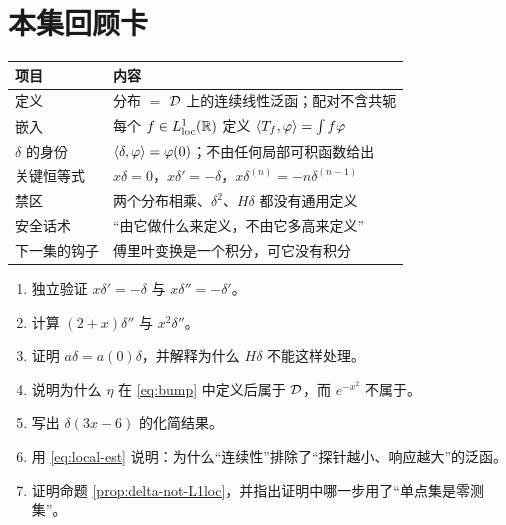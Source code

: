 \section{本集回顾卡}

\begin{center}
\small
\renewcommand{\arraystretch}{1.4}
\begin{tabularx}{\textwidth}{@{}L{3.4cm}Y@{}}
\toprule
项目 & 内容 \\
\midrule
定义 & 分布 $=$ $\mathcal{D}$ 上的连续线性泛函；配对不含共轭 \\
嵌入 & 每个 $f\in L^1_{\mathrm{loc}}(\mathbb{R})$ 定义 $\langle T_f,\varphi\rangle=\int f\varphi$ \\
$\delta$ 的身份 & $\langle \delta,\varphi\rangle=\varphi(0)$；不由任何局部可积函数给出 \\
关键恒等式 & $x\delta=0$，$x\delta'=-\delta$，$x\delta^{(n)}=-n\delta^{(n-1)}$ \\
禁区 & 两个分布相乘、$\delta^{2}$、$H\delta$ 都没有通用定义 \\
安全话术 & “由它做什么来定义，不由它多高来定义” \\
下一集的钩子 & 傅里叶变换是一个积分，可它没有积分 \\
\bottomrule
\end{tabularx}
\end{center}

\begin{quizbox}[EP05 自测]
\begin{enumerate}[leftmargin=1.6em,itemsep=0.35em]
\item 独立验证 $x\delta'=-\delta$ 与 $x\delta''=-\delta'$。
\item 计算 $(2+x)\delta''$ 与 $x^{2}\delta''$。
\item 证明 $a\delta=a(0)\delta$，并解释为什么 $H\delta$ 不能这样处理。
\item 说明为什么 $\eta$ 在 \eqref{eq:bump} 中定义后属于 $\mathcal{D}$，而 $e^{-x^{2}}$ 不属于。
\item 写出 $\delta(3x-6)$ 的化简结果。
\item 用 \eqref{eq:local-est} 说明：为什么“连续性”排除了“探针越小、响应越大”的泛函。
\item 证明命题 \ref{prop:delta-not-L1loc}，并指出证明中哪一步用了“单点集是零测集”。
\end{enumerate}
\end{quizbox}
